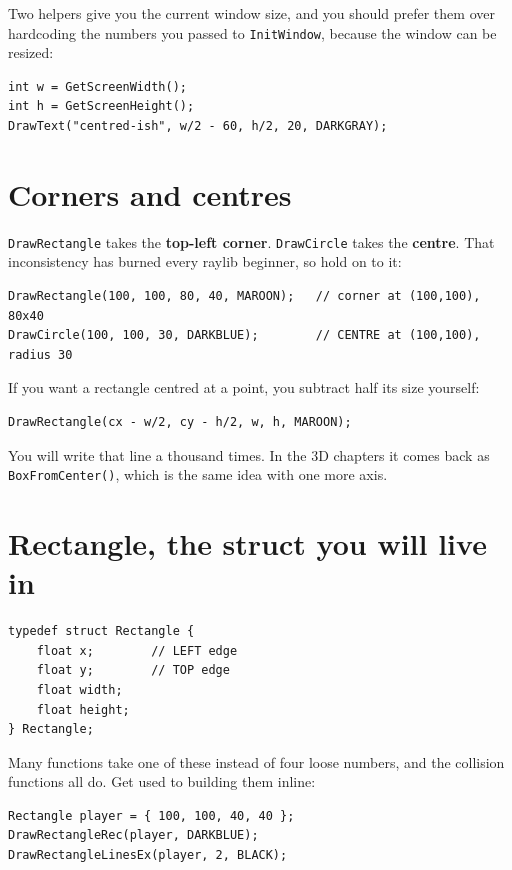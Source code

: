 Two helpers give you the current window size, and you should prefer them over
hardcoding the numbers you passed to \lstinline|InitWindow|, because the window
can be resized:

\begin{lstlisting}
int w = GetScreenWidth();
int h = GetScreenHeight();
DrawText("centred-ish", w/2 - 60, h/2, 20, DARKGRAY);
\end{lstlisting}

\section{Corners and centres}

\lstinline|DrawRectangle| takes the \textbf{top-left corner}.
\lstinline|DrawCircle| takes the \textbf{centre}. That inconsistency has burned
every raylib beginner, so hold on to it:

\begin{lstlisting}
DrawRectangle(100, 100, 80, 40, MAROON);   // corner at (100,100), 80x40
DrawCircle(100, 100, 30, DARKBLUE);        // CENTRE at (100,100), radius 30
\end{lstlisting}

If you want a rectangle centred at a point, you subtract half its size yourself:

\begin{lstlisting}
DrawRectangle(cx - w/2, cy - h/2, w, h, MAROON);
\end{lstlisting}

You will write that line a thousand times. In the 3D chapters it comes back as
\lstinline|BoxFromCenter()|, which is the same idea with one more axis.

\section{Rectangle, the struct you will live in}

\begin{lstlisting}
typedef struct Rectangle {
    float x;        // LEFT edge
    float y;        // TOP edge
    float width;
    float height;
} Rectangle;
\end{lstlisting}

Many functions take one of these instead of four loose numbers, and the
collision functions all do. Get used to building them inline:

\begin{lstlisting}
Rectangle player = { 100, 100, 40, 40 };
DrawRectangleRec(player, DARKBLUE);
DrawRectangleLinesEx(player, 2, BLACK);
\end{lstlisting}

